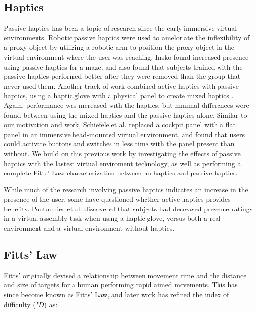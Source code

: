 
\subsection{Haptics}

Passive haptics has been a topic of research since the early immersive virtual environments.
Robotic passive haptics were used to ameloriate the inflexibility of a proxy object by utilizing a robotic arm to position the proxy object in the virtual environment where the user was reaching\cite{tachi_construction_1994,mcneely_robotic_1993}.
Insko\cite{insko_passive_2001} found increased presence using passive haptics for a maze, and also found that subjects trained with the passive haptics performed better after they were removed than the group that never used them.
Another track of work combined active haptics with passive haptics, using a haptic glove with a physical panel to create mixed haptics \cite{borst_evaluation_2005}.
Again, performance was increased with the haptics, but minimal differences were found between using the mixed haptics and the passive haptics alone.
Similar to our motivation and work, Schiefele et al.\cite{schiefele_simple_1998} replaced a cockpit panel with a flat panel in an immersive head-mounted virtual environment, and found that users could activate buttons and switches in less time with the panel present than without.
We build on this previous work by investigating the effects of passive haptics with the lastest virtual enviroment technology, as well as performing a complete Fitts' Law characterization between no haptics and passive haptics.

While much of the research involving passive haptics indicates an increase in the presence of the user, some have questioned whether active haptics provides benefits.
Pontonnier et al.\cite{pontonnier_designing_2014} discovered that subjects had decreased presence ratings in a virtual assembly task when using a haptic glove, versus both a real environment and a virtual environment without haptics.

\subsection{Fitts' Law}

Fitts' originally devised a relationship between movement time and the distance and size of targets for a human performing rapid aimed movements.
This has since become known as Fitts' Law, and later work has refined the index of difficulty (${ID}$) as:

